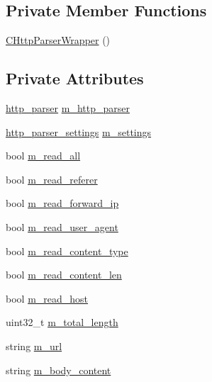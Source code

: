 \subsection*{Private Member Functions}
\begin{DoxyCompactItemize}
\item 
\hyperlink{class_c_http_parser_wrapper_a2049e652a14370c7a33c4d8ddbbe070e}{C\+Http\+Parser\+Wrapper} ()
\end{DoxyCompactItemize}
\subsection*{Private Attributes}
\begin{DoxyCompactItemize}
\item 
\hyperlink{structhttp__parser}{http\+\_\+parser} \hyperlink{class_c_http_parser_wrapper_ad1f59698d3f8171a895c332f3ce3d4de}{m\+\_\+http\+\_\+parser}
\item 
\hyperlink{structhttp__parser__settings}{http\+\_\+parser\+\_\+settings} \hyperlink{class_c_http_parser_wrapper_a9fccb894a6c0dd9e663a5b515ecb3c29}{m\+\_\+settings}
\item 
bool \hyperlink{class_c_http_parser_wrapper_a7e0c8bfd8cfa3e59b77480c2204548dd}{m\+\_\+read\+\_\+all}
\item 
bool \hyperlink{class_c_http_parser_wrapper_a7348de61f43161e9ee48becc0d3877e6}{m\+\_\+read\+\_\+referer}
\item 
bool \hyperlink{class_c_http_parser_wrapper_ac572e17c1571dc9f2e98ce0aeae66af2}{m\+\_\+read\+\_\+forward\+\_\+ip}
\item 
bool \hyperlink{class_c_http_parser_wrapper_ac96aecf14f9880e9aef1472deb111008}{m\+\_\+read\+\_\+user\+\_\+agent}
\item 
bool \hyperlink{class_c_http_parser_wrapper_abbb23d0903842b53d03362574c91da5d}{m\+\_\+read\+\_\+content\+\_\+type}
\item 
bool \hyperlink{class_c_http_parser_wrapper_a90ac8c4d85f31c3c38fe5eb19cfb59af}{m\+\_\+read\+\_\+content\+\_\+len}
\item 
bool \hyperlink{class_c_http_parser_wrapper_aa8a18bebb4b514762954c85edf17d0d2}{m\+\_\+read\+\_\+host}
\item 
uint32\+\_\+t \hyperlink{class_c_http_parser_wrapper_a0533f3ca12018fd75a42648cb76f7db9}{m\+\_\+total\+\_\+length}
\item 
string \hyperlink{class_c_http_parser_wrapper_a9f5239015aea78ed1d87d3f06d607f7a}{m\+\_\+url}
\item 
string \hyperlink{class_c_http_parser_wrapper_a9ebe569e94d37ff41e1518d474082b83}{m\+\_\+body\+\_\+content}

\end{DoxyCompactItemize}
